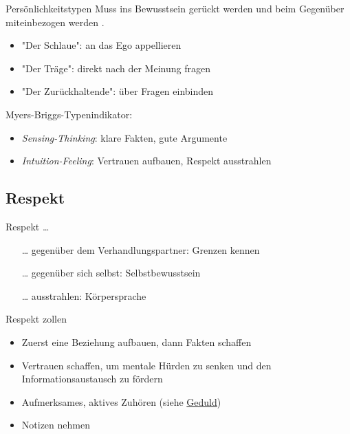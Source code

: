 \begin{frame}{Persönlichkeitstypen}
  Muss ins Bewusstsein gerückt werden und beim Gegenüber miteinbezogen werden
    \cite[][ch. 4.5.5]{helmold_verhandlungskonzepte_2019}.
  \begin{itemize}
	\item "Der Schlaue": an das Ego appellieren
	\item "Der Träge": direkt nach der Meinung fragen
	\item "Der Zurückhaltende": über Fragen einbinden
  \end{itemize}

  Myers-Briggs-Typenindikator:
  \begin{itemize}
    \item \textit{Sensing-Thinking}: klare Fakten, gute Argumente
    \item \textit{Intuition-Feeling}: Vertrauen aufbauen, Respekt ausstrahlen
  \end{itemize}
    
\end{frame}


\subsection{Respekt}

\begin{frame}

  Respekt \ldots

  \begin{itemize}
    \item[\ldots] gegenüber dem Verhandlungspartner: Grenzen kennen
    \item[\ldots] gegenüber sich selbst: Selbstbewusstsein
    \item[\ldots] ausstrahlen: Körpersprache
  \end{itemize}

\end{frame}

\begin{frame}{Respekt zollen}

  \begin{itemize}
    \item Zuerst eine Beziehung aufbauen, dann Fakten schaffen \cite[][p. 16]{mccarthy_advanced_2015}
    \item Vertrauen schaffen, um mentale Hürden zu senken und den Informationsaustausch zu fördern 
    \item Aufmerksames, aktives Zuhören (siehe \hyperref[sec:geduld]{Geduld})
    \item Notizen nehmen 
  \end{itemize}

\end{frame}

